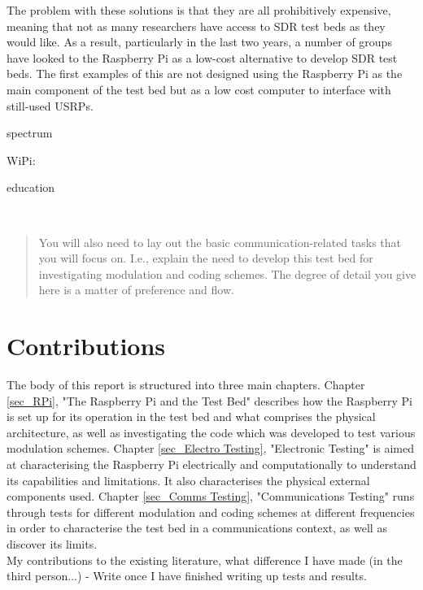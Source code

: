 \documentclass[../main.tex]{subfiles}
\begin{document}
The problem with these solutions is that they are all prohibitively expensive, meaning that not as many researchers have access to SDR test beds as they would like.
As a result, particularly in the last two years, a number of groups have looked to the Raspberry Pi as a low-cost alternative to develop SDR test beds.
The first examples of this are not designed using the Raspberry Pi as the main component of the test bed but as a low cost computer to interface with still-used USRPs.


spectrum \cite{pap_PiSDRTB_Spectrum}

WiPi:
\cite{pap_WiPi} 

education \cite{pap_PiSimulinkEducation}

\


\begin{quotation}
	You will also need to lay out the basic communication-related tasks that you will focus on.  I.e., explain the need to develop this test bed for investigating modulation and coding schemes.  The degree of detail you give here is a matter of preference and flow.
\end{quotation}




\section{Contributions}

The body of this report is structured into three main chapters.
Chapter \ref{sec_RPi}, "The Raspberry Pi and the Test Bed" describes how the Raspberry Pi is set up for its operation in the test bed and what comprises the physical architecture, as well as investigating the code which was developed to test various modulation schemes.
Chapter \ref{sec_Electro Testing}, "Electronic Testing" is aimed at characterising the Raspberry Pi electrically and computationally to understand its capabilities and limitations.
It also characterises the physical external components used.
Chapter \ref{sec_Comms Testing}, "Communications Testing" runs through tests for different modulation and coding schemes at different frequencies in order to characterise the test bed in a communications context, as well as discover its limits.\\

My contributions to the existing literature, what difference I have made (in the third person...) - Write once I have finished writing up tests and results.
\end{document}
